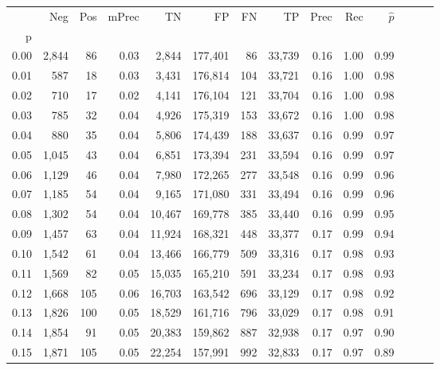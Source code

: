 \begin{tabular}{rrrrrrrrrrrrrr}
\toprule
{} &    Neg &  Pos & mPrec &       TN &       FP &      FN &      TP &  Prec &   Rec & $\hat{p}$ \\
p    &        &      &       &          &          &         &         &       &       &           \\
\midrule
0.00 &  2,844 &   86 &  0.03 &    2,844 &  177,401 &      86 &  33,739 &  0.16 &  1.00 &      0.99 \\
0.01 &    587 &   18 &  0.03 &    3,431 &  176,814 &     104 &  33,721 &  0.16 &  1.00 &      0.98 \\
0.02 &    710 &   17 &  0.02 &    4,141 &  176,104 &     121 &  33,704 &  0.16 &  1.00 &      0.98 \\
0.03 &    785 &   32 &  0.04 &    4,926 &  175,319 &     153 &  33,672 &  0.16 &  1.00 &      0.98 \\
0.04 &    880 &   35 &  0.04 &    5,806 &  174,439 &     188 &  33,637 &  0.16 &  0.99 &      0.97 \\
0.05 &  1,045 &   43 &  0.04 &    6,851 &  173,394 &     231 &  33,594 &  0.16 &  0.99 &      0.97 \\
0.06 &  1,129 &   46 &  0.04 &    7,980 &  172,265 &     277 &  33,548 &  0.16 &  0.99 &      0.96 \\
0.07 &  1,185 &   54 &  0.04 &    9,165 &  171,080 &     331 &  33,494 &  0.16 &  0.99 &      0.96 \\
0.08 &  1,302 &   54 &  0.04 &   10,467 &  169,778 &     385 &  33,440 &  0.16 &  0.99 &      0.95 \\
0.09 &  1,457 &   63 &  0.04 &   11,924 &  168,321 &     448 &  33,377 &  0.17 &  0.99 &      0.94 \\
0.10 &  1,542 &   61 &  0.04 &   13,466 &  166,779 &     509 &  33,316 &  0.17 &  0.98 &      0.93 \\
0.11 &  1,569 &   82 &  0.05 &   15,035 &  165,210 &     591 &  33,234 &  0.17 &  0.98 &      0.93 \\
0.12 &  1,668 &  105 &  0.06 &   16,703 &  163,542 &     696 &  33,129 &  0.17 &  0.98 &      0.92 \\
0.13 &  1,826 &  100 &  0.05 &   18,529 &  161,716 &     796 &  33,029 &  0.17 &  0.98 &      0.91 \\
0.14 &  1,854 &   91 &  0.05 &   20,383 &  159,862 &     887 &  32,938 &  0.17 &  0.97 &      0.90 \\
0.15 &  1,871 &  105 &  0.05 &   22,254 &  157,991 &     992 &  32,833 &  0.17 &  0.97 &      0.89 \\

\end{tabular}

